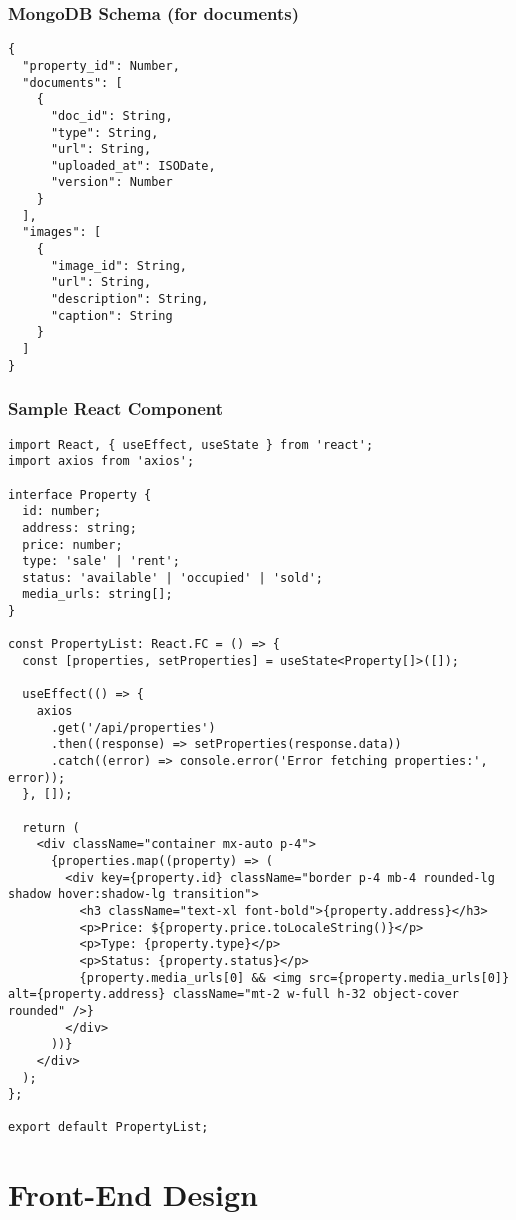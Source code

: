 \documentclass[12pt]{article}
\begin{document}
\subsubsection{MongoDB Schema (for documents)}
\begin{lstlisting}[caption=MongoDB Schema]
{
  "property_id": Number,
  "documents": [
    {
      "doc_id": String,
      "type": String,
      "url": String,
      "uploaded_at": ISODate,
      "version": Number
    }
  ],
  "images": [
    {
      "image_id": String,
      "url": String,
      "description": String,
      "caption": String
    }
  ]
}
\end{lstlisting}

\subsubsection{Sample React Component}
\begin{lstlisting}[caption=Sample React Component]
import React, { useEffect, useState } from 'react';
import axios from 'axios';

interface Property {
  id: number;
  address: string;
  price: number;
  type: 'sale' | 'rent';
  status: 'available' | 'occupied' | 'sold';
  media_urls: string[];
}

const PropertyList: React.FC = () => {
  const [properties, setProperties] = useState<Property[]>([]);

  useEffect(() => {
    axios
      .get('/api/properties')
      .then((response) => setProperties(response.data))
      .catch((error) => console.error('Error fetching properties:', error));
  }, []);

  return (
    <div className="container mx-auto p-4">
      {properties.map((property) => (
        <div key={property.id} className="border p-4 mb-4 rounded-lg shadow hover:shadow-lg transition">
          <h3 className="text-xl font-bold">{property.address}</h3>
          <p>Price: ${property.price.toLocaleString()}</p>
          <p>Type: {property.type}</p>
          <p>Status: {property.status}</p>
          {property.media_urls[0] && <img src={property.media_urls[0]} alt={property.address} className="mt-2 w-full h-32 object-cover rounded" />}
        </div>
      ))}
    </div>
  );
};

export default PropertyList;
\end{lstlisting}

\section{Front-End Design}
\end{document}
